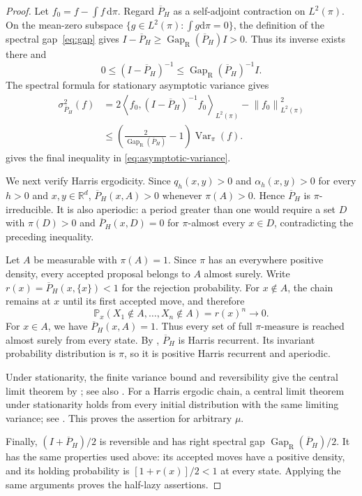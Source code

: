 \documentclass[11pt]{article}
\newcommand{\R}{\mathbb R}
\newcommand{\Var}{\operatorname{Var}}
\newcommand{\Gap}{\operatorname{Gap}_{\mathrm{R}}}
\newcommand{\ip}[2]{\left\langle #1,#2\right\rangle}
\newcommand{\norm}[1]{\left\lVert #1\right\rVert}
\newcommand{\1}{\mathbf 1}
\newcommand{\df}{\mathrm{d}}
\begin{document}
	\begin{proof}
		Let $f_0=f-\int f\,\df\pi$.
		Regard $\overline P_H$ as a self-adjoint contraction on $L^2(\pi)$.
		On the mean-zero subspace $\{g \in L^2(\pi): \int g\df \pi = 0\}$, the definition of the spectral gap~\eqref{eq:gap}
		gives $I- \overline P_H \geq\Gap(\overline P_H)I>0$. Thus its inverse exists there and
		\[
		0\leq(I-\overline P_H)^{-1}\leq\Gap(\overline P_H)^{-1}I.
		\]
		The spectral formula for stationary asymptotic variance
		\citep{KipnisVaradhan1986,Paulin2015} gives
		\[
		\begin{aligned}
			\sigma_{\overline P_H}^2(f)
			&=2\ip{f_0}{(I-\overline P_H)^{-1}f_0}_{L^2(\pi)}
			-\norm{f_0}_{L^2(\pi)}^2\\
			&\leq\left(\frac2{\Gap(\overline P_H)}-1\right)\Var_\pi(f).
		\end{aligned}
		\]
		 gives the final inequality in
		\eqref{eq:asymptotic-variance}.
		
		We next verify Harris ergodicity. Since $q_h(x,y)>0$ and
		$\alpha_h(x,y)>0$ for every $h>0$ and $x,y\in\R^d$,
		$
		\overline P_H(x,A)>0$ whenever $\pi(A)>0$.
		Hence $\overline P_H$ is $\pi$-irreducible. It is also aperiodic:
		a period greater than one would require a set $D$ with
		$\pi(D)>0$ and $\overline P_H(x,D)=0$ for $\pi$-almost every $x\in D$,
		contradicting the preceding inequality.
		
		Let $A$ be measurable with $\pi(A)=1$. Since $\pi$ has an
		everywhere positive density, every accepted proposal belongs to
		$A$ almost surely. Write $r(x)=\overline P_H(x,\{x\})<1$ for the rejection
		probability. For $x\notin A$, the chain remains at $x$ until its
		first accepted move, and therefore
		\[
		\mathbb P_x(X_1\notin A,\ldots,X_n\notin A)=r(x)^n
		\longrightarrow0.
		\]
		For $x\in A$, we have $\overline P_H(x,A)=1$. Thus every set of full
		$\pi$-measure is reached almost surely from every state.
		By \citet[Theorem~6(v)]{RobertsRosenthal2006Harris}, $\overline P_H$ is
		Harris recurrent. Its invariant probability distribution is
		$\pi$, so it is positive Harris recurrent and aperiodic.
		
		Under stationarity, the finite variance bound and reversibility
		give the central limit theorem by
		\citet[Theorem~7]{RobertsRosenthal2008VarianceBounding};
		see also \citet{KipnisVaradhan1986}.
		For a Harris ergodic chain, a central limit theorem under
		stationarity holds from every initial distribution with the
		same limiting variance; see \citet[Remark~6]{Jones2004CLT}.
		This proves the assertion for arbitrary $\mu$.
		
		Finally, $(I+\overline P_H)/2$ is reversible and has right spectral gap
		$\Gap(\overline P_H)/2$. It has the same properties used above: its
		accepted moves have a positive density, and its holding
		probability is $[1+r(x)]/2<1$ at every state. Applying the
		same arguments proves the half-lazy assertions.
	\end{proof}
	
\end{document}
